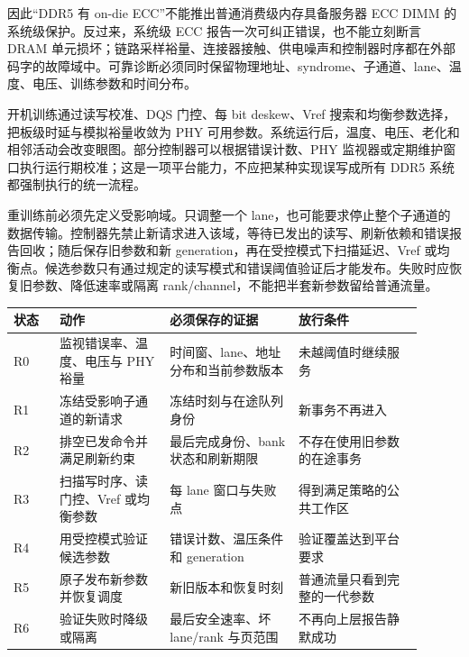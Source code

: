 因此“DDR5 有 on-die ECC”不能推出普通消费级内存具备服务器 ECC DIMM 的系统级保护。反过来，系统级 ECC 报告一次可纠正错误，也不能立刻断言 DRAM 单元损坏；链路采样裕量、连接器接触、供电噪声和控制器时序都在外部码字的故障域中。可靠诊断必须同时保留物理地址、syndrome、子通道、lane、温度、电压、训练参数和时间分布。


开机训练通过读写校准、DQS 门控、每 bit deskew、Vref 搜索和均衡参数选择，把板级时延与模拟裕量收敛为 PHY 可用参数。系统运行后，温度、电压、老化和相邻活动会改变眼图。部分控制器可以根据错误计数、PHY 监视器或定期维护窗口执行运行期校准；这是一项平台能力，不应把某种实现误写成所有 DDR5 系统都强制执行的统一流程。

重训练前必须先定义受影响域。只调整一个 lane，也可能要求停止整个子通道的数据传输。控制器先禁止新请求进入该域，等待已发出的读写、刷新依赖和错误报告回收；随后保存旧参数和新 generation，再在受控模式下扫描延迟、Vref 或均衡点。候选参数只有通过规定的读写模式和错误阈值验证后才能发布。失败时应恢复旧参数、降低速率或隔离 rank/channel，不能把半套新参数留给普通流量。

\begin{longtable}{L{0.10\linewidth}L{0.24\linewidth}L{0.29\linewidth}L{0.27\linewidth}}
\toprule
状态 & 动作 & 必须保存的证据 & 放行条件 \\
\midrule
R0 & 监视错误率、温度、电压与 PHY 裕量 & 时间窗、lane、地址分布和当前参数版本 & 未越阈值时继续服务 \\\tablerowrule
R1 & 冻结受影响子通道的新请求 & 冻结时刻与在途队列身份 & 新事务不再进入 \\\tablerowrule
R2 & 排空已发命令并满足刷新约束 & 最后完成身份、bank 状态和刷新期限 & 不存在使用旧参数的在途事务 \\\tablerowrule
R3 & 扫描写时序、读门控、Vref 或均衡参数 & 每 lane 窗口与失败点 & 得到满足策略的公共工作区 \\\tablerowrule
R4 & 用受控模式验证候选参数 & 错误计数、温压条件和 generation & 验证覆盖达到平台要求 \\\tablerowrule
R5 & 原子发布新参数并恢复调度 & 新旧版本和恢复时刻 & 普通流量只看到完整的一代参数 \\\tablerowrule
R6 & 验证失败时降级或隔离 & 最后安全速率、坏 lane/rank 与页范围 & 不再向上层报告静默成功 \\
\bottomrule
\end{longtable}


